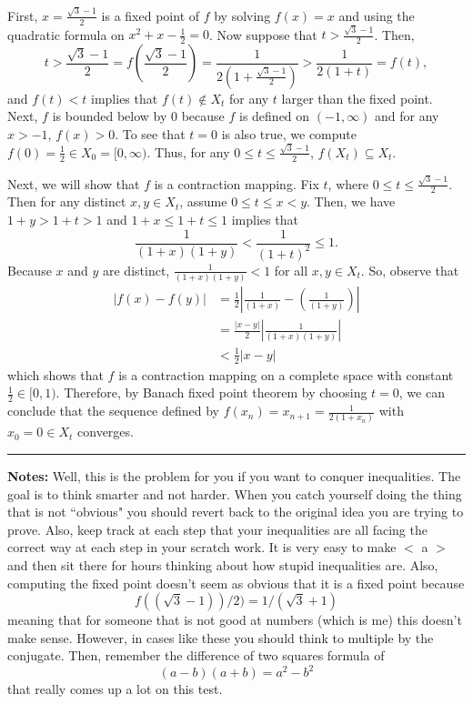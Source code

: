 \documentclass{article}
\begin{document}
First, $x = \frac{\sqrt{3}-1}{2}$ is a fixed point of $f$ by solving $f(x) = x$ and using the quadratic formula on $x^2 + x -\frac{1}{2} = 0$. Now suppose that $t >  \frac{\sqrt{3}-1}{2}$. Then, 
	\[ t >  \frac{\sqrt{3}-1}{2} = f( \frac{\sqrt{3}-1}{2}) = \frac{1}{2(1+ \frac{\sqrt{3}-1}{2})} > \frac{1}{2(1+t)} = f(t),\]
and $f(t) < t$ implies that $f(t) \not\in X_t$ for any $t$ larger than the fixed point. Next, $f$ is bounded below by 0 because $f$ is defined on $(-1,\infty)$ and for any $x>-1$, $f(x) > 0$. To see that $t = 0$ is also true, we compute $f(0) = \frac{1}{2} \in X_0 = [0,\infty)$. Thus, for any $0 \leq t \leq \frac{\sqrt{3} - 1}{2}$, $f(X_t) \subseteq X_t$. 

Next, we will show that $f$ is a contraction mapping. Fix $t$, where $0\leq t\leq \frac{\sqrt{3} - 1}{2}$. Then for any distinct $x,y\in X_t$, assume $0\leq t \leq  x < y$. Then, we have $1+y > 1+t  > 1$ and $1+x \leq 1+ t \leq 1$ implies that 
	\[ \frac{1}{(1+x)(1+y)}< \frac{1}{(1+t)^2} \leq 1.\]
Because $x$ and $y$ are distinct, $\frac{1}{(1+x)(1+y)}<1$ for all $x,y\in X_t$. So, observe that
	\begin{align}
		|f(x) - f(y)| & = \frac{1}{2}\left| \frac{1}{(1+x)} - \left(\frac{1}{(1+y)}\right)\right| \\
				& = \frac{|x-y|}{2} \left| \frac{1}{(1+x)(1+y)}\right|\\
				& < \frac{1}{2}|x-y|
	\end{align}
which shows that $f$ is a contraction mapping on a complete space with constant $\frac{1}{2}\in[0,1)$. Therefore, by Banach fixed point theorem by choosing $t = 0$, we can conclude that the sequence defined by $f(x_n) = x_{n+1} = \frac{1}{2(1+x_n)}$ with $x_0 = 0 \in X_t$ converges.\\

\hrule 

\textbf{Notes:} Well, this is the problem for you if you want to conquer inequalities. The goal is to think smarter and not harder. When you catch yourself doing the thing that is not ``obvious" you should revert back to the original idea you are trying to prove. Also, keep track at each step that your inequalities are all facing the correct way at each step in your scratch work. It is very easy to make $<$ a $>$ and then sit there for hours thinking about how stupid inequalities are. Also, computing the fixed point doesn't seem as obvious that it is a fixed point because 
	\[f((\sqrt{3}-1))/2) = 1/(\sqrt{3} + 1)\]
meaning that for someone that is not good at numbers (which is me) this doesn't make sense. However, in cases like these you should think to multiple by the conjugate. Then, remember the difference of two squares formula of 
	\[(a-b)(a+b) = a^2 - b^2\]
that really comes up a lot on this test.
\end{document}
